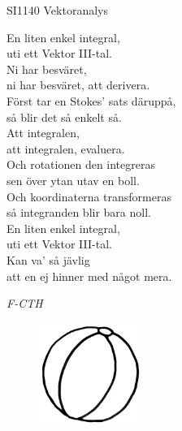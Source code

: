 \documentclass[a6paper,10pt]{article}
\begin{document}
\setlength{\oddsidemargin}{-0.47in}
\noindent
\begin{center}
\footnotesize SI1140 Vektoranalys\\
\end{center}
En liten enkel integral, \\
uti ett Vektor III-tal. \\
Ni har besväret, \\
ni har besväret, att derivera. 
\vspace{5pt} \\
Först tar en Stokes' sats däruppå, \\
så blir det så enkelt så. \\
Att integralen, \\
att integralen, evaluera. 
\vspace{5pt} \\
Och rotationen den integreras \\
sen över ytan utav en boll. \\
Och koordinaterna transformeras \\
så integranden blir bara noll. 
\vspace{5pt} \\
En liten enkel integral, \\
uti ett Vektor III-tal. \\
Kan va' så jävlig \\
att en ej hinner med något mera. 
\begin{flushright}
\textit{F-CTH}
\end{flushright}
\begin{figure}[!h]
\hspace{120pt}\includegraphics[width=0.3\textwidth]{boll.jpg}
\end{figure}
\end{document}
